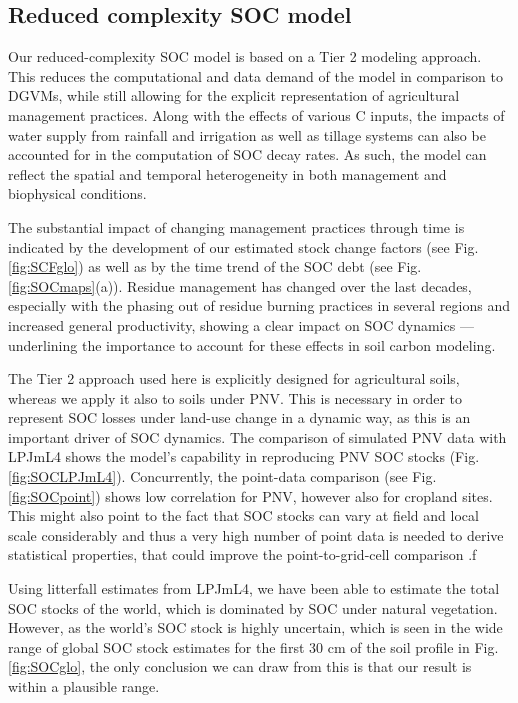 \documentclass[gc, manuscript]{copernicus}
\begin{document}
\hypertarget{reduced-complexity-soc-model}{%
\subsection{Reduced complexity SOC model}\label{reduced-complexity-soc-model}}

Our reduced-complexity SOC model is based on a Tier 2 modeling approach. This reduces the computational and data demand of the model in comparison to DGVMs, while still allowing for the explicit representation of agricultural management practices. Along with the effects of various C inputs, the impacts of water supply from rainfall and irrigation as well as tillage systems can also be accounted for in the computation of SOC decay rates. As such, the model can reflect the spatial and temporal heterogeneity in both management and biophysical conditions.

The substantial impact of changing management practices through time is indicated by the development of our estimated stock change factors (see Fig. \ref{fig:SCFglo}) as well as by the time trend of the SOC debt (see Fig. \ref{fig:SOCmaps}(a)). Residue management has changed over the last decades, especially with the phasing out of residue burning practices in several regions and increased general productivity, showing a clear impact on SOC dynamics --- underlining the importance to account for these effects in soil carbon modeling.

The Tier 2 approach \citep{ogle_cropland_in_ipcc_2019} used here is explicitly designed for agricultural soils, whereas we apply it also to soils under PNV. This is necessary in order to represent SOC losses under land-use change in a dynamic way, as this is an important driver of SOC dynamics. The comparison of simulated PNV data with LPJmL4 shows the model's capability in reproducing PNV SOC stocks (Fig. \ref{fig:SOCLPJmL4}).
Concurrently, the point-data comparison (see Fig. \ref{fig:SOCpoint}) shows low correlation for PNV, however also for cropland sites. This might also point to the fact that SOC stocks can vary at field and local scale considerably and thus a very high number of point data is needed to derive statistical properties, that could improve the point-to-grid-cell comparison \citep[see][]{rammig_generic_2018}.f

Using litterfall estimates from LPJmL4, we have been able to estimate the total SOC stocks of the world, which is dominated by SOC under natural vegetation. However, as the world's SOC stock is highly uncertain, which is seen in the wide range of global SOC stock estimates for the first 30 cm of the soil profile \citep{batjes_harmonized_2016, hengl_soilgrids250m_2017, fao_global_2018, schaphoff_lpjml4_2018-1, poggio_soilgrids_2021, sanderman_soil_2017} in Fig. \ref{fig:SOCglo}, the only conclusion we can draw from this is that our result is within a plausible range.
\end{document}
